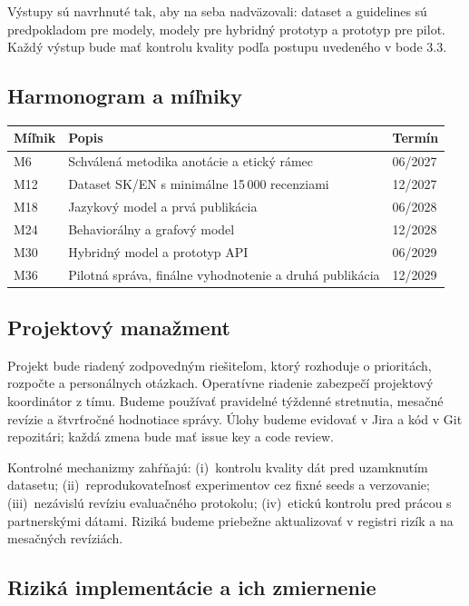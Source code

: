 \documentclass[11pt,a4paper]{article}
\begin{document}
Výstupy sú navrhnuté tak, aby na seba nadväzovali: dataset a guidelines sú predpokladom pre modely, modely pre hybridný prototyp a prototyp pre pilot. Každý výstup bude mať kontrolu kvality podľa postupu uvedeného v bode 3.3.

\subsection{Harmonogram a míľniky}

\begin{center}
\small
\begin{tabularx}{\textwidth}{@{}p{1.2cm} X p{1.8cm}@{}}
\toprule
Míľnik & Popis & Termín \\
\midrule
M6 & Schválená metodika anotácie a etický rámec & 06/2027 \\
M12 & Dataset SK/EN s minimálne 15\,000 recenziami & 12/2027 \\
M18 & Jazykový model a prvá publikácia & 06/2028 \\
M24 & Behaviorálny a grafový model & 12/2028 \\
M30 & Hybridný model a prototyp API & 06/2029 \\
M36 & Pilotná správa, finálne vyhodnotenie a druhá publikácia & 12/2029 \\
\bottomrule
\end{tabularx}
\end{center}

\subsection{Projektový manažment}

Projekt bude riadený zodpovedným riešiteľom, ktorý rozhoduje o prioritách, rozpočte a personálnych otázkach. Operatívne riadenie zabezpečí projektový koordinátor z tímu. Budeme používať pravidelné týždenné stretnutia, mesačné revízie a štvrťročné hodnotiace správy. Úlohy budeme evidovať v Jira a kód v Git repozitári; každá zmena bude mať issue key a code review.

Kontrolné mechanizmy zahŕňajú: (i)~kontrolu kvality dát pred uzamknutím datasetu; (ii)~reprodukovateľ\-nosť experimentov cez fixné seeds a verzovanie; (iii)~nezávislú revíziu evaluačného protokolu; (iv)~etickú kontrolu pred prácou s partnerskými dátami. Riziká budeme priebežne aktualizovať v registri rizík a na mesačných revíziách.

\subsection{Riziká implementácie a ich zmiernenie}
\end{document}
